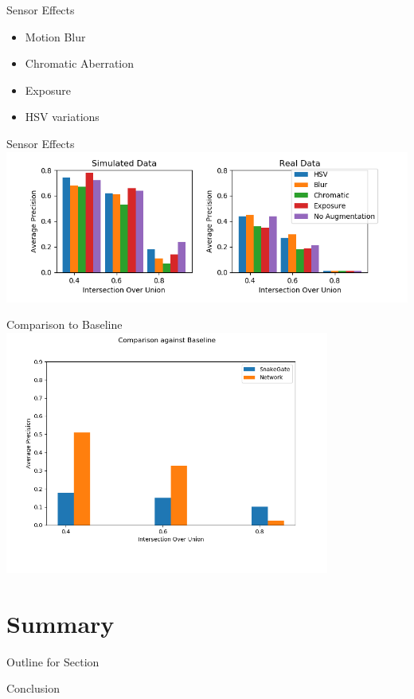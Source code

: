\documentclass{beamer}
\begin{document}
\begin{darkframes}
    \begin{frame}{Sensor Effects}
\begin{itemize}
	\item Motion Blur 
	\item Chromatic Aberration
	\item Exposure
	\item HSV variations
\end{itemize}
\end{frame}
    \begin{frame}{Sensor Effects}
    \includegraphics[width=\textwidth]{../../thesis/fig/pp_bar}
	\end{frame}


      \begin{frame}{Comparison to Baseline}
      \centering
    \includegraphics[width=0.8\textwidth]{../../thesis/fig/comp_baseline}
	\end{frame}

    
    \section{Summary}
            \begin{frame}{Outline for Section \thesection}
    \tableofcontents[currentsection]
\end{frame}
    \begin{frame}{Conclusion}


\end{frame}
\end{darkframes}
\end{document}

